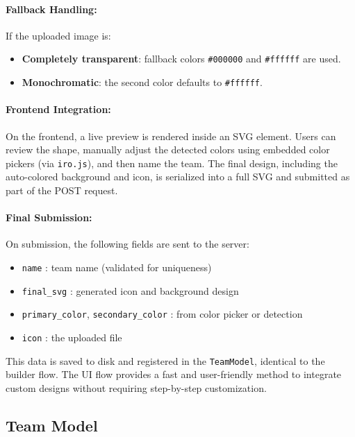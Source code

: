 \documentclass[12pt]{article}
\begin{document}
\paragraph{Fallback Handling:}
If the uploaded image is:
\begin{itemize}
    \item \textbf{Completely transparent}: fallback colors \texttt{\#000000} and \texttt{\#ffffff} are used.
    \item \textbf{Monochromatic}: the second color defaults to \texttt{\#ffffff}.
\end{itemize}

\paragraph{Frontend Integration:}
On the frontend, a live preview is rendered inside an SVG element. Users can review the shape, manually adjust the detected colors using embedded color pickers (via \texttt{iro.js}), and then name the team. The final design, including the auto-colored background and icon, is serialized into a full SVG and submitted as part of the POST request.

\paragraph{Final Submission:}
On submission, the following fields are sent to the server:

\begin{itemize}
    \item \texttt{name} : team name (validated for uniqueness)
    \item \texttt{final\_svg} : generated icon and background design
    \item \texttt{primary\_color}, \texttt{secondary\_color} : from color picker or detection
    \item \texttt{icon} : the uploaded file
\end{itemize}


\noindent This data is saved to disk and registered in the \texttt{TeamModel}, identical to the builder flow. The UI flow provides a fast and user-friendly method to integrate custom designs without requiring step-by-step customization.



\subsection{Team Model}
\end{document}
